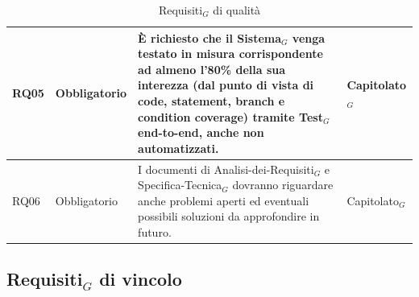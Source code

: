 \documentclass[10pt]{article}
\begin{document}
\begin{justify}
\begin{table}[H]
\begin{tabular}{|>{\centering\arraybackslash}m{2.7cm}|>{\centering\arraybackslash}m{2.7cm}|>{\centering\arraybackslash}m{6cm}|>{\centering\arraybackslash}m{2.1cm}|}
\hline
RQ05 & Obbligatorio & È richiesto che il Sistema$_G$ venga testato in misura corrispondente ad almeno l'80\% della sua interezza (dal punto di vista di code, statement, branch e condition coverage) tramite Test$_G$ end-to-end, anche non automatizzati.  & Capitolato$_G$\\
\hline
RQ06 & Obbligatorio & I documenti di Analisi-dei-Requisiti$_G$ e Specifica-Tecnica$_G$ dovranno riguardare anche problemi aperti ed eventuali possibili soluzioni da approfondire in futuro.  & Capitolato$_G$\\
\hline
\end{tabular}
\caption{Requisiti$_G$ di qualità}
\end{table}

\newpage
\subsection{Requisiti$_G$ di vincolo}


\end{justify}
\end{document}
